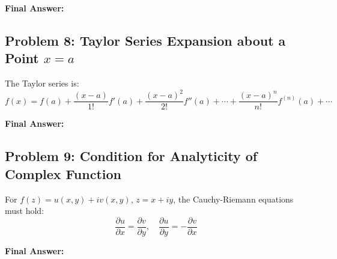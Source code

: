 \documentclass{article}
\begin{document}
\noindent\textbf{Final Answer: } 

\bigskip

\subsection*{Problem 8: Taylor Series Expansion about a Point \( x = a \)}

The Taylor series is:
\[
f(x) = f(a) + \frac{(x - a)}{1!} f'(a) + \frac{(x - a)^2}{2!} f''(a) + \cdots + \frac{(x - a)^n}{n!} f^{(n)}(a) + \cdots
\]

\noindent\textbf{Final Answer: } 

\bigskip

\subsection*{Problem 9: Condition for Analyticity of Complex Function}

For \( f(z) = u(x, y) + iv(x, y) \), \( z = x + iy \), the Cauchy-Riemann equations must hold:
\[
\frac{\partial u}{\partial x} = \frac{\partial v}{\partial y}, \quad \frac{\partial u}{\partial y} = -\frac{\partial v}{\partial x}
\]

\noindent\textbf{Final Answer: } 
\end{document}
